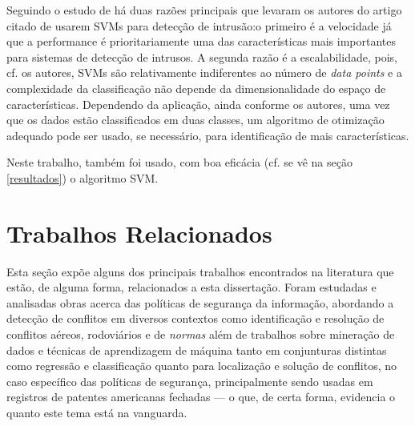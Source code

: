 Seguindo o estudo de \cite{mukkamala_intrusion_2002} há duas razões principais que levaram os autores do artigo citado de usarem SVMs para detecção de intrusão:o primeiro é a velocidade já que a performance é prioritariamente uma das características mais importantes para sistemas de detecção de intrusos. A segunda razão é a escalabilidade, pois, cf. os autores, SVMs são relativamente indiferentes ao número de \textit{data points} e a complexidade da classificação não depende da dimensionalidade do espaço de características. Dependendo da aplicação, ainda conforme os autores, uma vez que os dados estão classificados em duas classes, um algoritmo de otimização adequado pode ser usado, se necessário,  para identificação de mais características.

Neste trabalho, também foi usado, com boa eficácia (cf. se vê na seção \ref{resultados}) o algoritmo SVM.

\section{Trabalhos Relacionados}\label{trabalhos_relacionados}
Esta seção expõe alguns dos principais trabalhos encontrados na literatura que estão, de alguma forma, relacionados a esta dissertação. Foram estudadas e analisadas obras acerca das políticas de segurança da informação, abordando a detecção de conflitos em diversos contextos como identificação e resolução de conflitos aéreos, rodoviários e de \textit{normas} além de trabalhos sobre mineração de dados e técnicas de aprendizagem de máquina tanto em conjunturas distintas como regressão e classificação quanto para localização e solução de conflitos, no caso específico das políticas de segurança, principalmente sendo usadas em registros de patentes americanas fechadas --- o que, de certa forma, evidencia o quanto este tema está na vanguarda.


